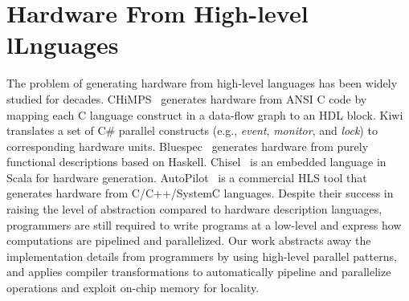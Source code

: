 
\section{Hardware From High-level lLnguages}
The problem of generating hardware from high-level languages has been widely studied for
decades.  CHiMPS~\cite{chimps} generates hardware from ANSI C code by
mapping each C language construct in a data-flow graph to an HDL block.
Kiwi~\cite{kiwi} translates a set of C\# parallel constructs (e.g.,
\emph{event}, \emph{monitor}, and \emph{lock}) to corresponding hardware units.
Bluespec~\cite{bluespec} generates hardware from purely functional descriptions
based on Haskell.  Chisel~\cite{chisel} is an embedded language in Scala
for hardware generation.  AutoPilot~\cite{autopilot} is a commercial HLS
tool that generates hardware from C/C++/SystemC languages.  Despite their
success in raising the level of abstraction compared to hardware description
languages, programmers are still required to write programs at a low-level and
express how computations are pipelined and parallelized. Our work
abstracts away the implementation details from programmers by using high-level
parallel patterns, and applies compiler transformations to
automatically pipeline and parallelize operations and exploit on-chip memory
for locality.

